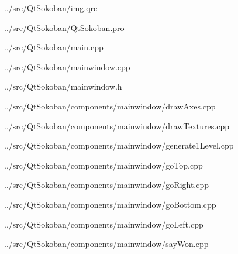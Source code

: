 
{../src/QtSokoban/img.qrc}


{../src/QtSokoban/QtSokoban.pro}

\newpage


{../src/QtSokoban/main.cpp}


{../src/QtSokoban/mainwindow.cpp}


{../src/QtSokoban/mainwindow.h}


{../src/QtSokoban/components/mainwindow/drawAxes.cpp}


{../src/QtSokoban/components/mainwindow/drawTextures.cpp}


{../src/QtSokoban/components/mainwindow/generate1Level.cpp}


{../src/QtSokoban/components/mainwindow/goTop.cpp}


{../src/QtSokoban/components/mainwindow/goRight.cpp}


{../src/QtSokoban/components/mainwindow/goBottom.cpp}


{../src/QtSokoban/components/mainwindow/goLeft.cpp}


{../src/QtSokoban/components/mainwindow/sayWon.cpp}
